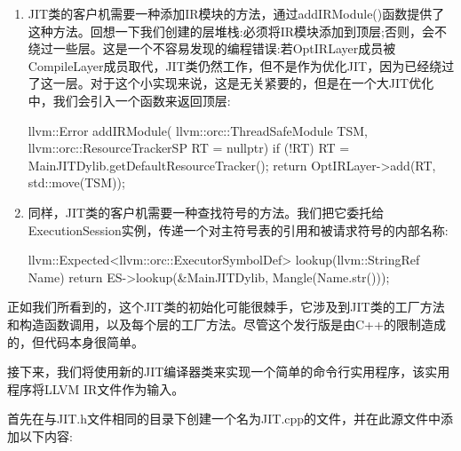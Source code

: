 \begin{enumerate}
\item
JIT类的客户机需要一种添加IR模块的方法，通过addIRModule()函数提供了这种方法。回想一下我们创建的层堆栈:必须将IR模块添加到顶层;否则，会不绕过一些层。这是一个不容易发现的编程错误:若OptIRLayer成员被CompileLayer成员取代，JIT类仍然工作，但不是作为优化JIT，因为已经绕过了这一层。对于这个小实现来说，这是无关紧要的，但是在一个大JIT优化中，我们会引入一个函数来返回顶层:

\begin{cpp}
    llvm::Error addIRModule(
            llvm::orc::ThreadSafeModule TSM,
            llvm::orc::ResourceTrackerSP RT = nullptr) {
        if (!RT)
            RT = MainJITDylib.getDefaultResourceTracker();
        return OptIRLayer->add(RT, std::move(TSM));
    }
\end{cpp}

\item
同样，JIT类的客户机需要一种查找符号的方法。我们把它委托给ExecutionSession实例，传递一个对主符号表的引用和被请求符号的内部名称:

\begin{cpp}
    llvm::Expected<llvm::orc::ExecutorSymbolDef>
    lookup(llvm::StringRef Name) {
        return ES->lookup({&MainJITDylib},
                            Mangle(Name.str()));
    }
\end{cpp}
\end{enumerate}

正如我们所看到的，这个JIT类的初始化可能很棘手，它涉及到JIT类的工厂方法和构造函数调用，以及每个层的工厂方法。尽管这个发行版是由C++的限制造成的，但代码本身很简单。

接下来，我们将使用新的JIT编译器类来实现一个简单的命令行实用程序，该实用程序将LLVM IR文件作为输入。


首先在与JIT.h文件相同的目录下创建一个名为JIT.cpp的文件，并在此源文件中添加以下内容:

